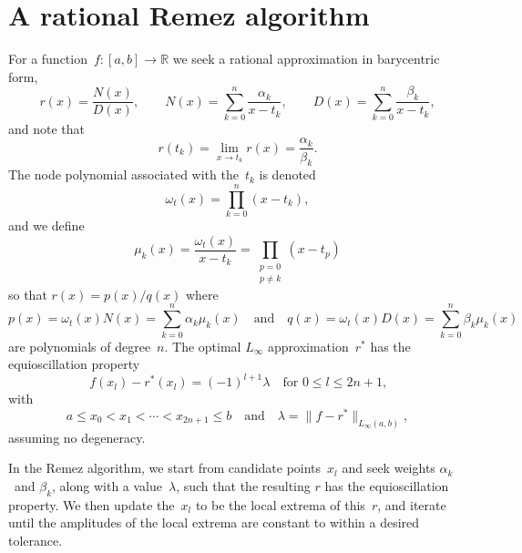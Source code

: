 \documentclass[12pt,a4paper]{article}
\begin{document}
\section{A rational Remez algorithm}
For a function~$f:[a,b]\to\mathbb{R}$ we seek a rational approximation in 
barycentric form,
\[
r(x)=\frac{N(x)}{D(x)},\qquad
N(x)=\sum_{k=0}^n\frac{\alpha_k}{x-t_k},\qquad
D(x)=\sum_{k=0}^n\frac{\beta_k}{x-t_k},
\]
and note that
\[
r(t_k)=\lim_{x\to t_k}r(x)=\frac{\alpha_k}{\beta_k}.
\]
The node polynomial associated with the~$t_k$ is denoted
\[
\omega_t(x)=\prod_{k=0}^n(x-t_k),
\]
and we define
\[
\mu_k(x)=\frac{\omega_t(x)}{x-t_k}=\prod_{\substack{p=0\\ p\ne k}}(x-t_p)
\]
so that $r(x)=p(x)/q(x)$ where 
\[
p(x)=\omega_t(x)N(x)=\sum_{k=0}^n\alpha_k\mu_k(x)
\quad\text{and}\quad
q(x)=\omega_t(x)D(x)=\sum_{k=0}^n\beta_k\mu_k(x)
\]
are polynomials of degree~$n$.  The optimal $L_\infty$ approximation~$r^*$ has 
the equioscillation property
\[
f(x_l)-r^*(x_l)=(-1)^{l+1}\lambda\quad\text{for $0\le l\le 2n+1$,}
\]
with 
\[
a\le x_0<x_1<\cdots<x_{2n+1}\le b\quad\text{and}\quad
\lambda=\|f-r^*\|_{L_\infty(a,b)},
\]
assuming no degeneracy.

In the Remez algorithm, we start from candidate points~$x_l$ and seek weights
$\alpha_k$~and $\beta_k$, along with a value~$\lambda$, such that the resulting
$r$ has the equioscillation property.  We then update the~$x_l$ to be the 
local extrema of this~$r$, and iterate until the amplitudes of the local extrema 
are constant to within a desired tolerance.
\end{document}
